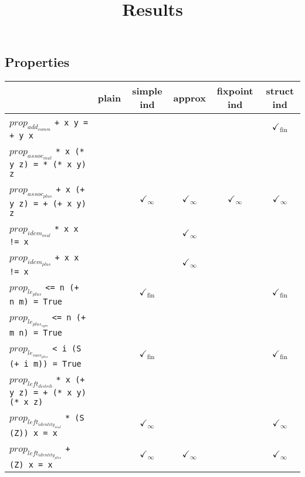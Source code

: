 \documentclass{article}
\begin{document}
\title{Results}
\maketitle

\subsection*{Properties}
\begin{longtable}{p{9cm} || c | c | c | c | c | }
  & plain & simple ind & approx & fixpoint ind & struct ind \\
\hline
$prop_{add_{comm}}$ \newline \verb`+ x y = + y x` &  &  &  &  & $\checkmark_{\mathrm{fin}}$ \\
\hline
$prop_{assoc_{mul}}$ \newline \verb`* x (* y z) = * (* x y) z` &  &  &  &  &  \\
\hline
$prop_{assoc_{plus}}$ \newline \verb`+ x (+ y z) = + (+ x y) z` &  & $\checkmark_{\infty}$ & $\checkmark_{\infty}$ & $\checkmark_{\infty}$ & $\checkmark_{\infty}$ \\
\hline
$prop_{idem_{mul}}$ \newline \verb`* x x != x` &  &  & $\checkmark_{\infty}$ &  &  \\
\hline
$prop_{idem_{plus}}$ \newline \verb`+ x x != x` &  &  & $\checkmark_{\infty}$ &  &  \\
\hline
$prop_{le_{plus}}$ \newline \verb`<= n (+ n m) = True` &  & $\checkmark_{\mathrm{fin}}$ &  &  & $\checkmark_{\mathrm{fin}}$ \\
\hline
$prop_{le_{plus_{sym}}}$ \newline \verb`<= n (+ m n) = True` &  &  &  &  &  \\
\hline
$prop_{le_{succ_{plus}}}$ \newline \verb`< i (S (+ i m)) = True` &  & $\checkmark_{\mathrm{fin}}$ &  &  & $\checkmark_{\mathrm{fin}}$ \\
\hline
$prop_{left_{distrib}}$ \newline \verb`* x (+ y z) = + (* x y) (* x z)` &  &  &  &  &  \\
\hline
$prop_{left_{identity_{mul}}}$ \newline \verb`* (S (Z)) x = x` &  & $\checkmark_{\infty}$ &  &  & $\checkmark_{\infty}$ \\
\hline
$prop_{left_{identity_{plus}}}$ \newline \verb`+ (Z) x = x` &  & $\checkmark_{\infty}$ & $\checkmark_{\infty}$ &  & $\checkmark_{\infty}$ \\

\end{longtable}
\end{document}
